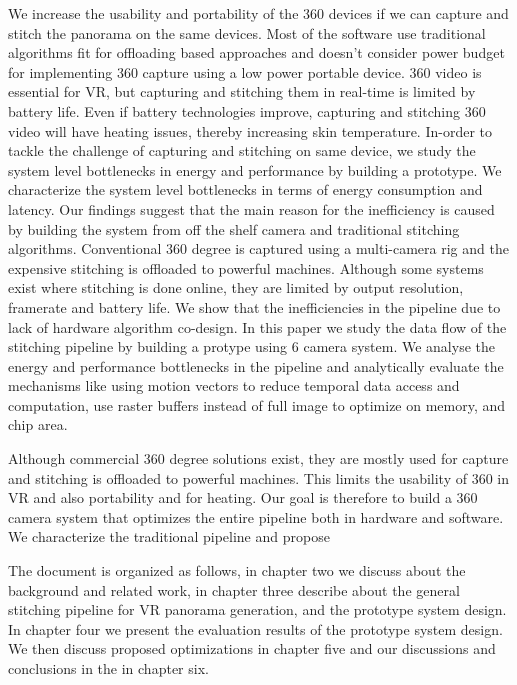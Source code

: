 We increase the usability and portability of the 360 devices if we can capture and stitch the panorama on the same devices. Most of the software use traditional algorithms fit for offloading based approaches and doesn't consider power budget for implementing 360 capture using a low power portable device. 
360 video is essential for VR, but capturing and stitching them in real-time is limited by battery life. Even if battery technologies improve, capturing and stitching 360 video will have heating issues, thereby increasing skin temperature. In-order to tackle the challenge of capturing and stitching on same device, we study the system level bottlenecks in energy and performance by building a prototype. We characterize the system level bottlenecks in terms of energy consumption and latency. %
Our findings suggest that the main reason for the inefficiency is caused by building the system from off the shelf camera and traditional stitching algorithms. Conventional 360 degree is captured using a multi-camera rig and the expensive stitching is offloaded to powerful machines. Although some systems exist where stitching is done online, they are limited by output resolution, framerate and battery life. We show that the inefficiencies in the pipeline due to lack of hardware algorithm co-design. In this paper we study the data flow of the stitching pipeline by building a protype using 6 camera system. We analyse the energy and performance bottlenecks in the pipeline and analytically evaluate the mechanisms like using motion vectors to reduce temporal data access and computation, use raster buffers instead of full image to optimize on memory, and chip area. 
 
 Although commercial 360 degree solutions exist, they are mostly used for capture and stitching is offloaded to powerful machines. This limits the usability of 360 in VR and also portability and for heating. Our goal is therefore to build a 360 camera system that optimizes the entire pipeline both in hardware and software. We characterize the traditional pipeline and propose


The document is organized as follows, in chapter two we discuss about the background and related work, in chapter three describe about the general stitching pipeline for VR panorama generation, and the prototype system design. In chapter four we present the evaluation results of the prototype system design. We then discuss proposed optimizations in chapter five and our discussions and conclusions in the  in chapter six.

